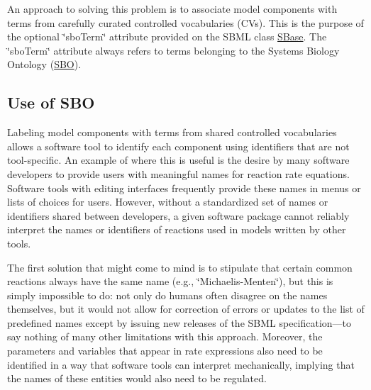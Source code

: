 An approach to solving this problem is to associate model components with terms from carefully curated controlled vocabularies (C\+Vs). This is the purpose of the optional \char`\"{}sbo\+Term\char`\"{} attribute provided on the S\+B\+ML class \hyperlink{class_s_base}{S\+Base}. The \char`\"{}sbo\+Term\char`\"{} attribute always refers to terms belonging to the Systems Biology Ontology (\hyperlink{class_s_b_o}{S\+BO}).\hypertarget{class_s_b_o_use}{}\subsection{Use of S\+BO}\label{class_s_b_o_use}
Labeling model components with terms from shared controlled vocabularies allows a software tool to identify each component using identifiers that are not tool-\/specific. An example of where this is useful is the desire by many software developers to provide users with meaningful names for reaction rate equations. Software tools with editing interfaces frequently provide these names in menus or lists of choices for users. However, without a standardized set of names or identifiers shared between developers, a given software package cannot reliably interpret the names or identifiers of reactions used in models written by other tools.

The first solution that might come to mind is to stipulate that certain common reactions always have the same name (e.\+g., \char`\"{}\+Michaelis-\/\+Menten\char`\"{}), but this is simply impossible to do\+: not only do humans often disagree on the names themselves, but it would not allow for correction of errors or updates to the list of predefined names except by issuing new releases of the S\+B\+ML specification---to say nothing of many other limitations with this approach. Moreover, the parameters and variables that appear in rate expressions also need to be identified in a way that software tools can interpret mechanically, implying that the names of these entities would also need to be regulated.

